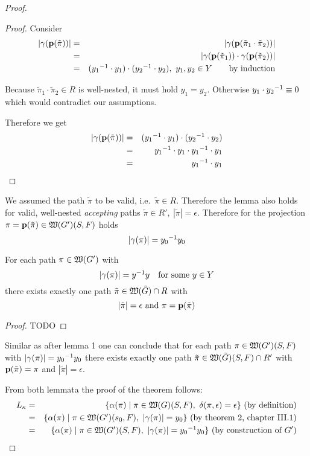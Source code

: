 \begin{proof}
\begin{proof}
Consider 
\begin{eqnarray*}
|\gamma(\mathbf{p}({\tilde{\pi}}))| &=& |\gamma(\mathbf{p}({\tilde{\pi}_1 \cdot
\tilde{\pi}_2}))| \\
&=& |\gamma(\mathbf{p}({\tilde{\pi}_1})) \cdot \gamma(\mathbf{p}({\tilde{\pi}_2}))| \\
&=& (\mbox{${y_1}^{-1}$} \cdot y_1) \cdot (\mbox{${y_2}^{-1}$} \cdot y_2),\ y_1, y_2 \in
Y\qquad\text{by induction}
\end{eqnarray*}

Because $\tilde{\pi}_1 \cdot \tilde{\pi}_2 \in R$ is well-nested, it must hold
$y_1 = y_2$. Otherwise $y_1 \cdot \mbox{${y_2}^{-1}$} \equiv 0$ which would contradict our
 assumptions.

Therefore we get
\begin{eqnarray*}
|\gamma(\mathbf{p}({\tilde{\pi}}))| &=& (\mbox{${y_1}^{-1}$} \cdot y_1) \cdot (\mbox{${y_2}^{-1}$} \cdot
y_2)\\
&=& \mbox{${y_1}^{-1}$} \cdot y_1 \cdot \mbox{${y_1}^{-1}$} \cdot y_1 \\
&=& \mbox{${y_1}^{-1}$} \cdot y_1
\end{eqnarray*}
\end{proof}

We assumed the path $\tilde{\pi}$ to be valid, i.e.\ $\tilde{\pi} \in R$.
Therefore the lemma also holds for valid, well-nested {\em accepting} paths
$\tilde{\pi} \in R',\ |\tilde{\pi}| = \epsilon$. Therefore for the
projection $\pi = \mathbf{p}({\tilde{\pi}}) \in \mbox{$\mathfrak{W}({G'})$}(S, F)$ holds
\[ |\gamma(\pi)| = \mbox{${y_0}^{-1}$} y_0 \]

\bigskip
\begin{lemma}
For each path $\pi \in \mbox{$\mathfrak{W}({G'})$}$ with
\[ |\gamma(\pi)| = \mbox{${y}^{-1}$} y \quad\text{for some }y \in Y \]
there exists exactly one path $\tilde{\pi} \in \mbox{$\mathfrak{W}({\tilde{G}})$} \cap R$ with
\[ |\tilde{\pi}| = \epsilon\text{ and }\pi = \mathbf{p}({\tilde{\pi}}) \] 
\end{lemma}

\begin{proof}
TODO
\end{proof}

Similar as after lemma 1 one can conclude that for each path $\pi \in
\mbox{$\mathfrak{W}({G'})$}(S, F)$ with $|\gamma(\pi)| = \mbox{${y_0}^{-1}$}y_0$ there exists exactly one
path $\tilde{\pi} \in \mbox{$\mathfrak{W}({\tilde{G}})$}(S, F) \cap R'$ with
$\mathbf{p}({\tilde{\pi}}) = \pi$ and $|\tilde{\pi}| = \epsilon$.

From both lemmata the proof of the theorem follows:
\begin{eqnarray*}
L_\kappa &=& \setof{\alpha(\pi) \mid \pi \in \pathcat{G}(S, F),\ \delta(\pi,
\epsilon) = \epsilon}\text{ (by definition)} \\
&=& \setof{\alpha(\pi) \mid \pi \in \pathcat{G'}(s_0, F),\ |\gamma(\pi)| =
y_0}\text{ (by theorem 2, chapter III.1)} \\
&=& \setof{\alpha(\pi) \mid \pi \in \pathcat{G'}(S, F),\
|\gamma(\pi)| = \inv{y_0} y_0}\text{ (by construction of $G'$)}
\end{eqnarray*}


\end{proof}
